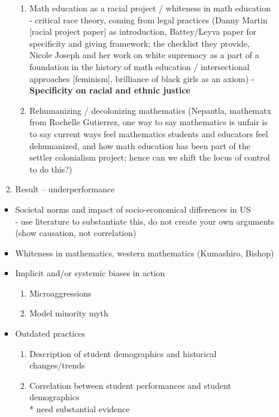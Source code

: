 \begin{enumerate}
\begin{enumerate}
\begin{enumerate}
\begin{enumerate}
        \item Math education as a racial project / whiteness in math education - critical race theory, coming from legal practices (Danny Martin [racial project paper] as introduction, Battey/Leyva paper for specificity and giving framework; the checklist they provide, Nicole Joseph and her work on white supremacy as a part of a foundation in the history of math education / intersectional approaches [feminism], brilliance of black girls as an axiom) - {\bf Specificity on racial and ethnic justice}
        \item Rehumanizing / decolonizing mathematics (Nepantla, mathematx from Rochelle Gutierrez, one way to say mathematics is unfair is to say current ways feel mathematics students and educators feel dehumanized, and how math education has been part of the settler colonialism project; hence can we shift the locus of control to do this?)
      \end{enumerate}
      \item Result -- underperformance
    \end{enumerate}
    \begin{itemize}
          \item Societal norms and impact of socio-economical differences in US\\
          - use literature to substantiate this, do not create your own arguments (show causation, not correlation)
          \item Whiteness in mathematics, western mathematics (Kumashiro, Bishop)
          \item Implicit and/or systemic biases in action
          \begin{enumerate}
            \item Microaggressions
            \item Model minority myth
          \end{enumerate}
          \item Outdated practices
          \begin{enumerate}
            \item Description of student demographics and historical changes/trends
            \item Correlation between student performances and student demographics
            \\ * need substantial evidence
          \end{enumerate}
    \end{itemize}
  \end{enumerate}

\end{enumerate}
